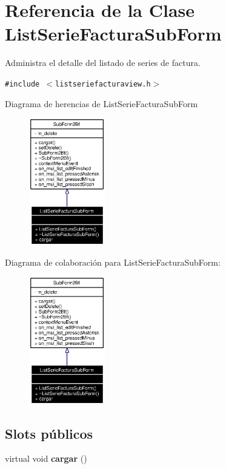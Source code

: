 \section{Referencia de la Clase List\-Serie\-Factura\-Sub\-Form}
\label{classListSerieFacturaSubForm}
Administra el detalle del listado de series de factura.  


{\tt \#include $<$listseriefacturaview.h$>$}

Diagrama de herencias de List\-Serie\-Factura\-Sub\-Form\begin{figure}[H]
\begin{center}
\leavevmode
\includegraphics[width=94pt]{classListSerieFacturaSubForm__inherit__graph}
\end{center}
\end{figure}
Diagrama de colaboraci\'{o}n para List\-Serie\-Factura\-Sub\-Form:\begin{figure}[H]
\begin{center}
\leavevmode
\includegraphics[width=94pt]{classListSerieFacturaSubForm__coll__graph}
\end{center}
\end{figure}
\subsection*{Slots p\'{u}blicos}
\begin{CompactItemize}
\item 
virtual void {\bf cargar} ()\label{classListSerieFacturaSubForm_i0}

\end{CompactItemize}
